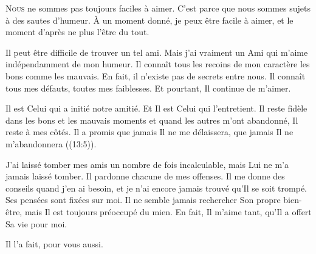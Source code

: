






\lettrine{N}{ous} ne sommes pas toujours faciles à aimer.
 C'est parce que nous sommes sujets à des sautes d'humeur.
 À un moment donné, je peux être facile à aimer,
 et le moment d'après ne plus l'être du tout.


Il peut être difficile de trouver un tel ami.
 Mais j'ai vraiment un Ami qui m'aime indépendamment de mon humeur.
 Il connaît tous les recoins de mon caractère
 \ocadr les bons comme les mauvais.
 En fait, il n'existe pas de secrets entre nous.
 Il connaît tous mes défauts, toutes mes faiblesses.
 Et pourtant, Il continue de m'aimer.

Il est Celui qui a initié notre amitié. Et Il est Celui qui l'entretient.
 Il reste fidèle dans les bons et les mauvais moments et quand les autres
 m'ont abandonné, Il reste à mes côtés. Il a promis que jamais
 Il ne me délaissera, que jamais Il ne m'abandonnera ((13:5)).

J'ai laissé tomber mes amis un nombre de fois incalculable,
 mais Lui ne m'a jamais laissé tomber.
 Il pardonne chacune de mes offenses. Il me donne des conseils
 quand j'en ai besoin, et je n'ai encore jamais trouvé qu'Il se soit trompé.
 Ses pensées sont fixées sur moi. 
 Il ne semble jamais rechercher 
 Son propre bien-être, mais Il est toujours préoccupé du mien.
 En fait, Il m'aime tant, qu'Il a offert Sa vie pour moi.

Il l'a fait, pour vous aussi.

\dvrule



